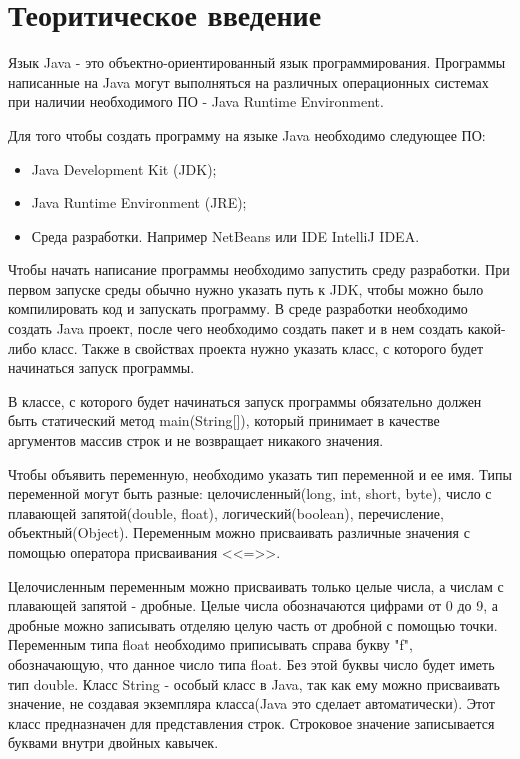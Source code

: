 \documentclass[14pt, a4paper]{extarticle}
\begin{document}
\makeatletter
\renewcommand{\l@section}{\@dottedtocline{1}{0em}{1.25em}}
\renewcommand{\l@subsection}{\@dottedtocline{2}{0em}{1.75em}}
\renewcommand{\l@subsubsection}{\@dottedtocline{3}{0em}{2.6em}}
\renewcommand{\@dotsep}{1.25}
\makeatother

\def\contentsname{СОДЕРЖАНИЕ}

\begin{titlepage}

\end{titlepage}

\section*{Теоритическое введение}
Язык Java - это объектно-ориентированный язык
программирования. Программы написанные на Java могут выполняться
на различных операционных системах при наличии необходимого ПО -
Java Runtime Environment.

Для того чтобы создать программу на языке Java необходимо
следующее ПО:
\begin{itemize}
\item Java Development Kit (JDK);
\item Java Runtime Environment (JRE);
\item Среда разработки. Например NetBeans или IDE IntelliJ IDEA.
\end{itemize}
Чтобы начать написание программы необходимо запустить среду
разработки. При первом запуске среды обычно нужно указать путь к
JDK, чтобы можно было компилировать код и запускать программу. В
среде разработки необходимо создать Java проект, после чего
необходимо создать пакет и в нем создать какой-либо класс. Также в
свойствах проекта нужно указать класс, с которого будет начинаться
запуск программы.

В классе, с которого будет начинаться запуск программы
обязательно должен быть статический метод main(String[]), который
принимает в качестве аргументов массив строк и не возвращает
никакого значения. 

Чтобы объявить переменную, необходимо указать тип переменной
и ее имя. Типы переменной могут быть разные: целочисленный(long, int,
short, byte), число с плавающей запятой(double, float),
логический(boolean), перечисление, объектный(Object).
Переменным можно присваивать различные значения с помощью
оператора присваивания <<=>>.

Целочисленным переменным можно присваивать только целые
числа, а числам с плавающей запятой - дробные. Целые числа
обозначаются цифрами от 0 до 9, а дробные можно записывать отделяю
целую часть от дробной с помощью точки. Переменным типа float
необходимо приписывать справа букву "f", обозначающую, что данное
число типа float. Без этой буквы число будет иметь тип double.
Класс String - особый класс в Java, так как ему можно присваивать
значение, не создавая экземпляра класса(Java это сделает
автоматически). Этот класс предназначен для представления строк.
Строковое значение записывается буквами внутри двойных кавычек.
\end{document}
